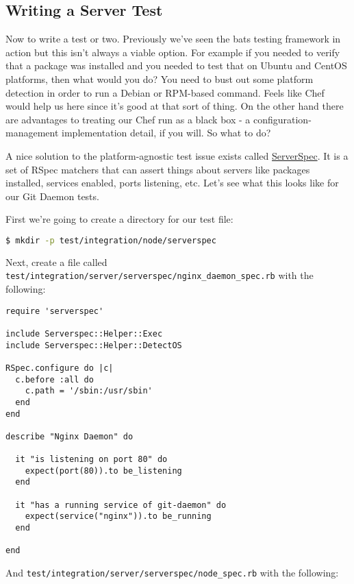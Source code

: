 \subsection{Writing a Server Test}

Now to write a test or two. Previously we've seen the bats testing framework in action but this isn't always a viable option. For example if you needed to verify that a package was installed and you needed to test that on Ubuntu and CentOS platforms, then what would you do? You need to bust out some platform detection in order to run a Debian or RPM-based command. Feels like Chef would help us here since it's good at that sort of thing. On the other hand there are advantages to treating our Chef run as a black box - a configuration-management implementation detail, if you will. So what to do?

A nice solution to the platform-agnostic test issue exists called \href{http://serverspec.org/}{ServerSpec}. It is a set of RSpec matchers that can assert things about servers like packages installed, services enabled, ports listening, etc. Let's see what this looks like for our Git Daemon tests.

First we're going to create a directory for our test file:

\begin{lstlisting}[language=Bash,label=lst:testing-test-kitchen36]
$ mkdir -p test/integration/node/serverspec
\end{lstlisting}

Next, create a file called \lstinline!test/integration/server/serverspec/nginx_daemon_spec.rb! with the following:

\begin{lstlisting}[label=lst:testing-test-kitchen37]
require 'serverspec'

include Serverspec::Helper::Exec
include Serverspec::Helper::DetectOS

RSpec.configure do |c|
  c.before :all do
    c.path = '/sbin:/usr/sbin'
  end
end

describe "Nginx Daemon" do

  it "is listening on port 80" do
    expect(port(80)).to be_listening
  end

  it "has a running service of git-daemon" do
    expect(service("nginx")).to be_running
  end

end
\end{lstlisting}

And \lstinline!test/integration/server/serverspec/node_spec.rb! with the following:


